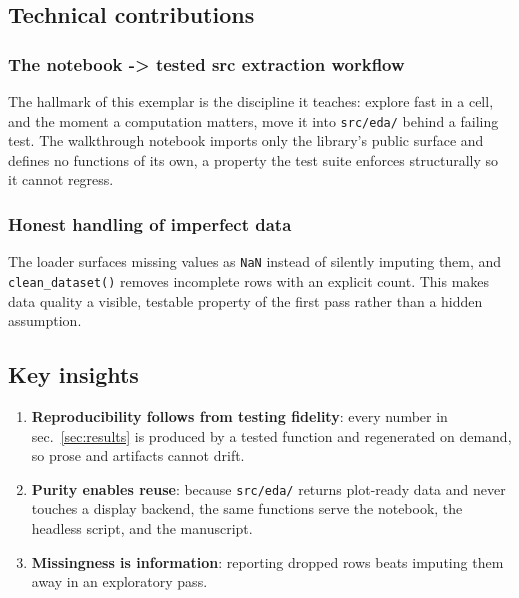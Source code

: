 \documentclass[
  english,
]{article}
\providecommand{\tightlist}{%
  \setlength{\itemsep}{0pt}\setlength{\parskip}{0pt}}
\begin{document}
\subsection{Technical contributions}\label{technical-contributions}

\subsubsection{The notebook -\textgreater{} tested src extraction
workflow}\label{the-notebook---tested-src-extraction-workflow-1}

The hallmark of this exemplar is the discipline it teaches: explore fast
in a cell, and the moment a computation matters, move it into
\texttt{src/eda/} behind a failing test. The walkthrough notebook
imports only the library's public surface and defines no functions of
its own, a property the test suite enforces structurally so it cannot
regress.

\subsubsection{Honest handling of imperfect
data}\label{honest-handling-of-imperfect-data}

The loader surfaces missing values as \texttt{NaN} instead of silently
imputing them, and \texttt{clean\_dataset()} removes incomplete rows
with an explicit count. This makes data quality a visible, testable
property of the first pass rather than a hidden assumption.

\subsection{Key insights}\label{key-insights}

\begin{enumerate}
\def\labelenumi{\arabic{enumi}.}
\tightlist
\item
  \textbf{Reproducibility follows from testing fidelity}: every number
  in sec.~\ref{sec:results} is produced by a tested function and
  regenerated on demand, so prose and artifacts cannot drift.
\item
  \textbf{Purity enables reuse}: because \texttt{src/eda/} returns
  plot-ready data and never touches a display backend, the same
  functions serve the notebook, the headless script, and the manuscript.
\item
  \textbf{Missingness is information}: reporting dropped rows beats
  imputing them away in an exploratory pass.
\end{enumerate}
\end{document}
